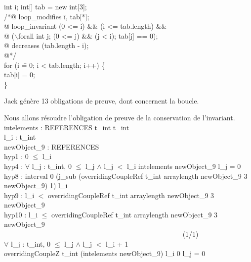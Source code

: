 \small
\begin{tt}
\begin{tabbing}

{\purple int} i; {\purple int}[] tab = {\purple new int}[3];\\
/*\=@ {\purple loop\_modifies} \= i, tab[*]; \+\\
  @ {\purple loop\_invariant}  (0 <= i) \&\& (i <= tab.length) \&\& \\
  @        \>({\purple $\backslash$forall} int j; (0 <= j) \&\& (j < i); tab[j] == 0);\\
  @ {\purple decreases} (tab.length - i);\\
  @*/ \- \\
{\purple for} (i \== 0; i < tab.length; i++) \{  \\
  \>tab[i] = 0;  \\
\}
\end{tabbing}
\end{tt}
\rarrow Jack g\'en\`ere 13 obligations de preuve, 
dont {  concernent} la boucle.

Nous allons r\'esoudre l'obligation de preuve de la 
{\purple conservation de l'invariant}.
\small
intelements : REFERENCES \rarrow t\_int \rarrow t\_int\\
l\_i : t\_int\\
newObject\_9 : REFERENCES\\
hyp1 : 0 $\leq$ l\_i\\
hyp4 : $\forall$ l\_j : t\_int,
       0 $\leq$ l\_j $\wedge$ l\_j $<$ l\_i \rarrow intelements newObject\_9 l\_j = 0\\
hyp8 : interval 0
         (j\_sub
            (overridingCoupleRef t\_int arraylength newObject\_9 3 newObject\_9)
            1) l\_i\\
hyp9 : l\_i $<$
       overridingCoupleRef t\_int arraylength newObject\_9 3 newObject\_9\\
hyp10 : l\_i $\leq$
        overridingCoupleRef t\_int arraylength newObject\_9 3 newObject\_9\\
----------------------------------------------------------------------------- (1/1)\\
$\forall$ l\_j : t\_int,
0 $\leq$ l\_j $\wedge$ l\_j $<$ l\_i + 1 \rarrow\\
overridingCoupleZ t\_int (intelements newObject\_9) l\_i 0 l\_j = 0

